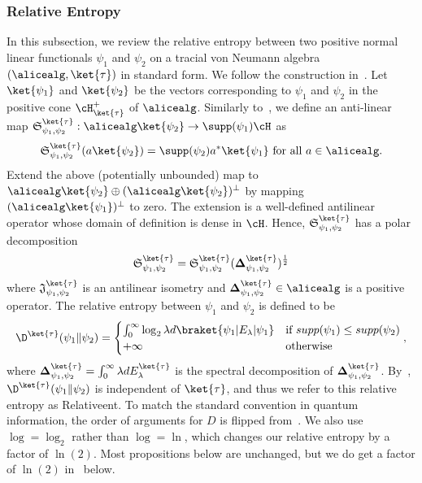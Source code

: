 \subsubsection{Relative Entropy}
In this subsection, we review the relative entropy between two positive normal linear functionals $\psi_1$ and $\psi_2$ on a tracial von Neumann algebra $(\alicealg, \ket{\tau})$ in standard form. We follow the construction in~\cite[Section 2]{arakiRelativeEntropyStates1977}. Let $\ket{\psi_1}$ and $\ket{\psi_2}$ be the vectors corresponding to $\psi_1$ and $\psi_2$ in the positive cone $\cH_{\ket{\tau}}^{+}$ of $\alicealg$. Similarly to~, we define an anti-linear map $\mathfrak{S}_{\psi_1, \psi_2}^{\ket{\tau}} : \alicealg \ket{\psi_2}  \rightarrow \supp(\psi_1) \cH$ as
\begin{equation} \label{eq:Relative_modular_map}
	\mathfrak{S}_{\psi_1, \psi_2}^{\ket{\tau}}(a \ket{\psi_2}) =\supp(\psi_2) a^{*}\ket{\psi_1} \text{ for all } a \in \alicealg.
\end{equation}
Extend the above (potentially unbounded) map to $\alicealg \ket{\psi_2} \oplus (\alicealg \ket{\psi_2})^{\perp}$ by mapping $(\alicealg \ket{\psi_1})^{\perp}$ to zero. The extension is a well-defined antilinear operator whose domain of definition is dense in $\cH$. Hence, $\mathfrak{S}_{\psi_1, \psi_2}^{\ket{\tau}}$ has a polar decomposition
\begin{equation} 
	\mathfrak{S}_{\psi_1, \psi_2}^{\ket{\tau}} =  \mathfrak{S}_{\psi_1, \psi_2}^{\ket{\tau}}(\mathbf{\Delta}_{\psi_1, \psi_2}^{\ket{\tau}})^{\frac{1}{2}}
\end{equation}
where $\mathfrak{J}_{\psi_1, \psi_2}^{\ket{\tau}}$ is an antilinear isometry and $\mathbf{\Delta}_{\psi_1, \psi_2}^{\ket{\tau}} \in \alicealg$ is a positive operator. The relative entropy between $\psi_1$ and $\psi_2$ is defined to be 
\begin{equation} \label{eq:relative_ent}
	\D^{\ket{\tau}}(\psi_1 \| \psi_2) = \begin{cases}
		\int_{0}^{\infty} \log_2{\lambda} d \braket{\psi_1|E_{\lambda}|\psi_1} & \text{if } supp(\psi_1) \leq supp(\psi_2) \\
		+ \infty & \text{otherwise}
	\end{cases},
\end{equation}
where $\mathbf{\Delta}_{\psi_1, \psi_2}^{\ket{\tau}} = \int_{0}^{\infty} \lambda d E_{\lambda}^{\ket{\tau}}$ is the spectral decomposition of $\mathbf{\Delta}_{\psi_1, \psi_2}^{\ket{\tau}}$. 
By~, $\D^{\ket{\tau}}(\psi_1 \| \psi_2)$ is independent of $\ket{\tau}$, and thus we refer to this relative entropy as \gls{Relativeent}. To match the standard convention in quantum information, the order of arguments for $D$ is flipped from~\cite[Definition 3.1]{arakiRelativeEntropyStates1977}. We also use $\log = \log_2$ rather than $\log = \ln$, which changes our relative entropy by a factor of $\ln(2)$. Most propositions below are unchanged, but we do get a factor of $\ln(2)$ in~ below. 


